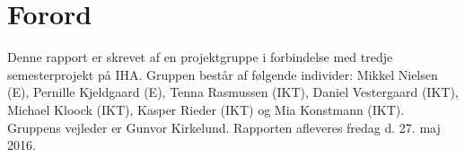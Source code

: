 \chapter{Forord}
Denne rapport er skrevet af en projektgruppe i forbindelse med tredje semesterprojekt på IHA. Gruppen består af følgende individer: Mikkel Nielsen (E), Pernille Kjeldgaard (E), Tenna Rasmussen (IKT), Daniel Vestergaard (IKT), Michael Kloock (IKT), Kasper Rieder (IKT) og Mia Konstmann (IKT). Gruppens vejleder er Gunvor Kirkelund. Rapporten afleveres fredag d. 27. maj 2016. 
